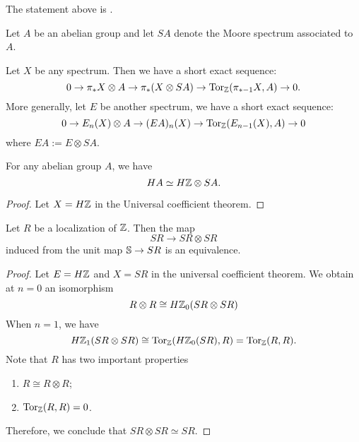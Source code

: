 \begin{remark}
	The statement above is \cite[Proposition 2.4]{BousfieldSpectra}.
\end{remark}

Let $A$ be an abelian group and let $SA$ denote the Moore spectrum associated to $A$. 
\begin{theorem}
	Let $X$ be any spectrum. Then we have a short exact sequence:
	\[
	0\to 
	\pi_{*}X\otimes A \to
	\pi_{*}(X\otimes S A)
	\to
	\operatorname{Tor}_{{\mathbb{Z}}}(\pi_{*-1}X, A)\to 
	0.
	\]
	More generally, let $E$ be another spectrum, we have a short exact sequence:
	\[
	0\to 
	E_n(X)\otimes A 
	\to
	(EA)_n(X)
	\to
	\operatorname{Tor}_{\mathbb{Z}}(E_{n-1}(X),A)
	\to
	0
	\]
	where $EA:= E\otimes SA$.
\end{theorem}

\begin{corollary}
	For any abelian group $A$, we have 
	\[
	HA\simeq H{\mathbb{Z}}\otimes SA.
	\]
\end{corollary}
\begin{proof}
	Let $X=H{\mathbb{Z}}$ in the Universal coefficient theorem.
\end{proof}

\begin{corollary}
Let $R$ be a localization of ${\mathbb{Z}}$.
	Then the map
	\[
	SR\to SR\otimes SR
	\]
	induced from the unit map ${\mathbb{S}} \to SR$ is an equivalence.
\end{corollary}
\begin{proof}
	Let $E=H{\mathbb{Z}}$ and $X=SR$ in the universal coefficient theorem. We obtain at $n=0$
	an isomorphism
	$$
	R\otimes R \cong H{\mathbb{Z}}_0(SR \otimes SR)
	$$
	When $n= 1$, we have
	\[
	H{\mathbb{Z}}_1(SR \otimes SR) \cong \operatorname{Tor}_{\mathbb{Z}}(H{\mathbb{Z}}_{0}(SR),R)=\operatorname{Tor}_{\mathbb{Z}}(R,R).
	\]
	Note that $R$ has two important properties
	\begin{enumerate}
		\item $R\cong R\otimes R$;
		\item $\operatorname{Tor}_{{\mathbb{Z}}}(R,R)=0$.
	\end{enumerate}
	Therefore, we conclude that $SR\otimes SR\simeq SR$. 
\end{proof}


